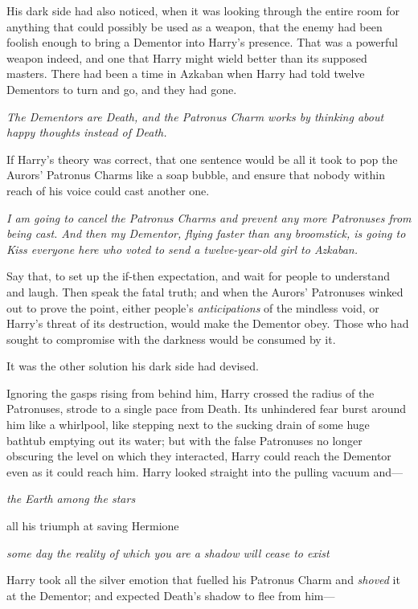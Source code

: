 His dark side had also noticed, when it was looking through the entire room for anything that could possibly be used as a weapon, that the enemy had been foolish enough to bring a Dementor into Harry's presence. That was a powerful weapon indeed, and one that Harry might wield better than its supposed masters. There had been a time in Azkaban when Harry had told twelve Dementors to turn and go, and they had gone.

\emph{The Dementors are Death, and the Patronus Charm works by thinking about happy thoughts instead of Death.}

If Harry's theory was correct, that one sentence would be all it took to pop the Aurors' Patronus Charms like a soap bubble, and ensure that nobody within reach of his voice could cast another one.

\emph{I am going to cancel the Patronus Charms and prevent any more Patronuses from being cast. And then my Dementor, flying faster than any broomstick, is going to Kiss everyone here who voted to send a twelve-year-old girl to Azkaban.}

Say that, to set up the if-then expectation, and wait for people to understand and laugh. Then speak the fatal truth; and when the Aurors' Patronuses winked out to prove the point, either people's \emph{anticipations} of the mindless void, or Harry's threat of its destruction, would make the Dementor obey. Those who had sought to compromise with the darkness would be consumed by it.

It was the other solution his dark side had devised.

Ignoring the gasps rising from behind him, Harry crossed the radius of the Patronuses, strode to a single pace from Death. Its unhindered fear burst around him like a whirlpool, like stepping next to the sucking drain of some huge bathtub emptying out its water; but with the false Patronuses no longer obscuring the level on which they interacted, Harry could reach the Dementor even as it could reach him. Harry looked straight into the pulling vacuum and—

\emph{the Earth among the stars}

all his triumph at saving Hermione

\emph{some day the reality of which you are a shadow will cease to exist}

Harry took all the silver emotion that fuelled his Patronus Charm and \emph{shoved} it at the Dementor; and expected Death's shadow to flee from him—

